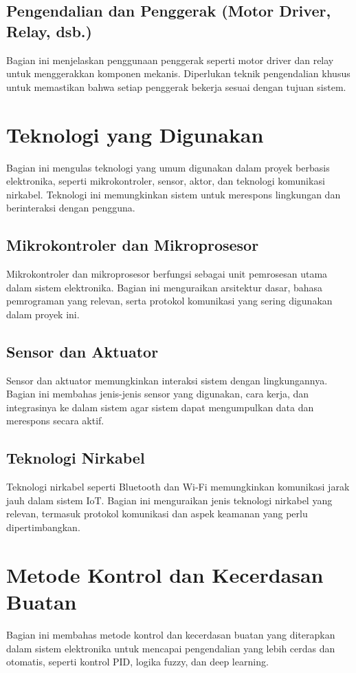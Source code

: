 \subsection{Pengendalian dan Penggerak (Motor Driver, Relay, dsb.)}
Bagian ini menjelaskan penggunaan penggerak seperti motor driver dan relay untuk menggerakkan komponen mekanis. Diperlukan teknik pengendalian khusus untuk memastikan bahwa setiap penggerak bekerja sesuai dengan tujuan sistem.

\section{Teknologi yang Digunakan}
Bagian ini mengulas teknologi yang umum digunakan dalam proyek berbasis elektronika, seperti mikrokontroler, sensor, aktor, dan teknologi komunikasi nirkabel. Teknologi ini memungkinkan sistem untuk merespons lingkungan dan berinteraksi dengan pengguna.

\subsection{Mikrokontroler dan Mikroprosesor}
Mikrokontroler dan mikroprosesor berfungsi sebagai unit pemrosesan utama dalam sistem elektronika. Bagian ini menguraikan arsitektur dasar, bahasa pemrograman yang relevan, serta protokol komunikasi yang sering digunakan dalam proyek ini.

\subsection{Sensor dan Aktuator}
Sensor dan aktuator memungkinkan interaksi sistem dengan lingkungannya. Bagian ini membahas jenis-jenis sensor yang digunakan, cara kerja, dan integrasinya ke dalam sistem agar sistem dapat mengumpulkan data dan merespons secara aktif.

\subsection{Teknologi Nirkabel}
Teknologi nirkabel seperti Bluetooth dan Wi-Fi memungkinkan komunikasi jarak jauh dalam sistem IoT. Bagian ini menguraikan jenis teknologi nirkabel yang relevan, termasuk protokol komunikasi dan aspek keamanan yang perlu dipertimbangkan.

\section{Metode Kontrol dan Kecerdasan Buatan}
Bagian ini membahas metode kontrol dan kecerdasan buatan yang diterapkan dalam sistem elektronika untuk mencapai pengendalian yang lebih cerdas dan otomatis, seperti kontrol PID, logika fuzzy, dan deep learning.

